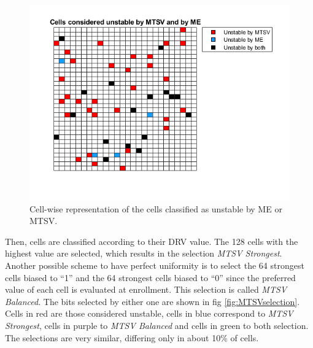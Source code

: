  \begin{figure}[H]
    \centering
    \includegraphics[width=14cm]{images/unstable_all.png}
    \caption{Cell-wise representation of the cells classified as unstable by ME or MTSV.}
    \label{fig:unstable_all}
\end{figure}
    


Then, cells are classified according to their DRV value. The 128 cells with the highest value are selected, which results in the selection \textit{MTSV Strongest}. Another possible scheme to have perfect uniformity is to select the 64 strongest cells biased to ``1'' and the 64 strongest cells biased to ``0'' since the preferred value of each cell is evaluated at enrollment. This selection is called \textit{MTSV Balanced}. The bits selected by either one are shown in fig \ref{fig:MTSVselection}. Cells in red are those considered unstable, cells in blue correspond to \textit{MTSV Strongest}, cells in purple to \textit{MTSV Balanced} and cells in green to both selection. The selections are very similar, differing only in about 10\% of cells. 

